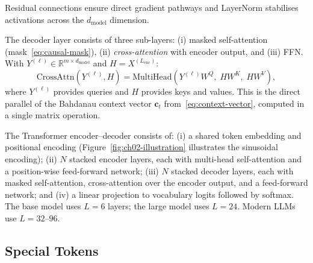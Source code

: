 \begin{deepdive}
Residual connections ensure direct gradient pathways and LayerNorm stabilises
activations across the $d_{\mathrm{model}}$ dimension.

The decoder layer consists of three sub-layers: (i) masked self-attention
(mask~\eqref{eq:causal-mask}), (ii) \emph{cross-attention} with encoder output, and
(iii) FFN.
With $Y^{(\ell)} \in \mathbb{R}^{m \times d_{\mathrm{model}}}$ and
$H = X^{(L_{\mathrm{enc}})}$:
\begin{equation}
  \mathrm{CrossAttn}(Y^{(\ell)}, H)
  = \mathrm{MultiHead}\!\left(Y^{(\ell)} W^Q,\; H W^K,\; H W^V\right),
  \label{eq:cross-attn}
\end{equation}
where $Y^{(\ell)}$ provides queries and $H$ provides keys and values.
This is the direct parallel of the Bahdanau context vector $\mathbf{c}_t$
from~\eqref{eq:context-vector}, computed in a single matrix operation.

\begin{remark}
The Transformer encoder--decoder consists of: (i) a shared token embedding and
positional encoding (Figure~\ref{fig:ch02-illustration} illustrates the sinusoidal
encoding); (ii) $N$ stacked encoder layers, each with multi-head self-attention
and a position-wise feed-forward network; (iii) $N$ stacked decoder layers, each
with masked self-attention, cross-attention over the encoder output, and a
feed-forward network; and (iv) a linear projection to vocabulary logits followed
by softmax.  The base model uses $L = 6$ layers; the large model uses $L = 24$.
Modern LLMs use $L = 32$--$96$.
\end{remark}

\subsection{Special Tokens}
\label{sec:special-tokens}


\end{deepdive}
